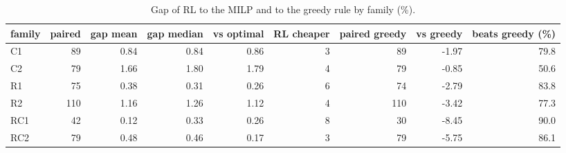 \begin{table}[H]\centering
\small
\caption{Gap of RL to the MILP and to the greedy rule by family (\%).}\label{tab:qualityclass}
\begin{adjustbox}{max width=\textwidth}\begin{tabular}{lrrrrrrrr}\toprule
family & paired & gap mean & gap median & vs optimal & RL cheaper & paired greedy & vs greedy & beats greedy (\%) \\ \midrule
C1 & 89 & 0.84 & 0.84 & 0.86 & 3 & 89 & -1.97 & 79.8 \\
C2 & 79 & 1.66 & 1.80 & 1.79 & 4 & 79 & -0.85 & 50.6 \\
R1 & 75 & 0.38 & 0.31 & 0.26 & 6 & 74 & -2.79 & 83.8 \\
R2 & 110 & 1.16 & 1.26 & 1.12 & 4 & 110 & -3.42 & 77.3 \\
RC1 & 42 & 0.12 & 0.33 & 0.26 & 8 & 30 & -8.45 & 90.0 \\
RC2 & 79 & 0.48 & 0.46 & 0.17 & 3 & 79 & -5.75 & 86.1 \\
\bottomrule\end{tabular}\end{adjustbox}\end{table}
